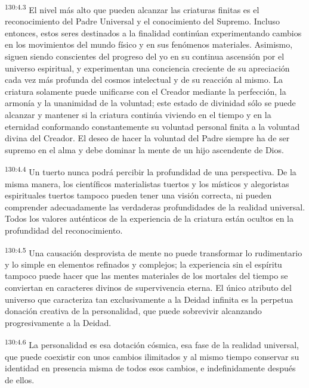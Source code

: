 \par
\textsuperscript{130:4.3} El nivel más alto que pueden alcanzar las criaturas finitas es el reconocimiento del Padre Universal y el conocimiento del Supremo. Incluso entonces, estos seres destinados a la finalidad continúan experimentando cambios en los movimientos del mundo físico y en sus fenómenos materiales. Asimismo, siguen siendo conscientes del progreso del yo en su continua ascensión por el universo espiritual, y experimentan una conciencia creciente de su apreciación cada vez más profunda del cosmos intelectual y de su reacción al mismo. La criatura solamente puede unificarse con el Creador mediante la perfección, la armonía y la unanimidad de la voluntad; este estado de divinidad sólo se puede alcanzar y mantener si la criatura continúa viviendo en el tiempo y en la eternidad conformando constantemente su voluntad personal finita a la voluntad divina del Creador. El deseo de hacer la voluntad del Padre siempre ha de ser supremo en el alma y debe dominar la mente de un hijo ascendente de Dios.

\par
\textsuperscript{130:4.4} Un tuerto nunca podrá percibir la profundidad de una perspectiva. De la misma manera, los científicos materialistas tuertos y los místicos y alegoristas espirituales tuertos tampoco pueden tener una visión correcta, ni pueden comprender adecuadamente las verdaderas profundidades de la realidad universal. Todos los valores auténticos de la experiencia de la criatura están ocultos en la profundidad del reconocimiento.

\par
\textsuperscript{130:4.5} Una causación desprovista de mente no puede transformar lo rudimentario y lo simple en elementos refinados y complejos; la experiencia sin el espíritu tampoco puede hacer que las mentes materiales de los mortales del tiempo se conviertan en caracteres divinos de supervivencia eterna. El único atributo del universo que caracteriza tan exclusivamente a la Deidad infinita es la perpetua donación creativa de la personalidad, que puede sobrevivir alcanzando progresivamente a la Deidad.

\par
\textsuperscript{130:4.6} La personalidad es esa dotación cósmica, esa fase de la realidad universal, que puede coexistir con unos cambios ilimitados y al mismo tiempo conservar su identidad en presencia misma de todos esos cambios, e indefinidamente después de ellos.

